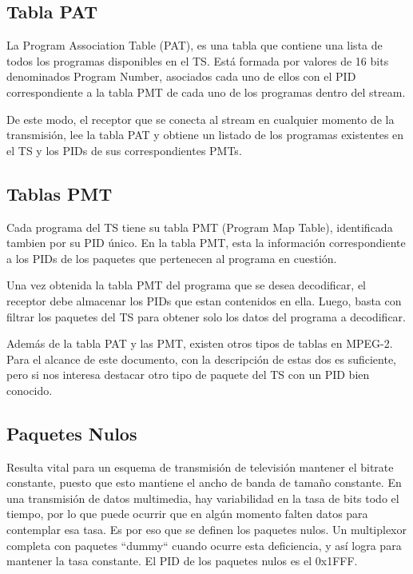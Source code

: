	\subsection{Tabla PAT}
	La Program Association Table (PAT), es una tabla que contiene una lista de todos los programas disponibles en el TS. Está formada por valores de 16 bits denominados Program Number, asociados cada uno de ellos con el PID correspondiente a la tabla PMT de cada uno de los programas dentro del stream. 
	
	De este modo, el receptor que se conecta al stream en cualquier momento de la transmisión, lee la tabla PAT y obtiene un listado de los programas existentes en el TS y los PIDs de sus correspondientes PMTs. 

	\subsection{Tablas PMT}

	Cada programa del TS tiene su tabla PMT (Program Map Table), identificada tambien por su PID único. En la tabla PMT, esta la información correspondiente a los PIDs de los paquetes que pertenecen al programa en cuestión.
	
	Una vez obtenida la tabla \gls{PMT} del programa que se desea decodificar, el receptor debe almacenar los PIDs que estan contenidos en ella. Luego, basta con filtrar los paquetes del TS para obtener solo los datos del programa a decodificar. 
		
	Además de la tabla PAT y las PMT, existen otros tipos de tablas en MPEG-2. Para el alcance de este documento, con la descripción de estas dos es suficiente, pero si nos interesa destacar otro tipo de paquete del TS con un PID bien conocido.
	
	\subsection{Paquetes Nulos}
	
	Resulta vital para un esquema de transmisión de televisión mantener el bitrate constante, puesto que esto mantiene el ancho de banda de tamaño constante. En una transmisión de datos multimedia, hay variabilidad en la tasa de bits todo el tiempo, por lo que puede ocurrir que en algún momento falten datos para contemplar esa tasa. Es por eso que se definen los paquetes nulos. Un multiplexor completa con paquetes ``dummy`` cuando ocurre esta deficiencia, y así logra para mantener la tasa constante. El PID de los paquetes nulos es el 0x1FFF.
	
